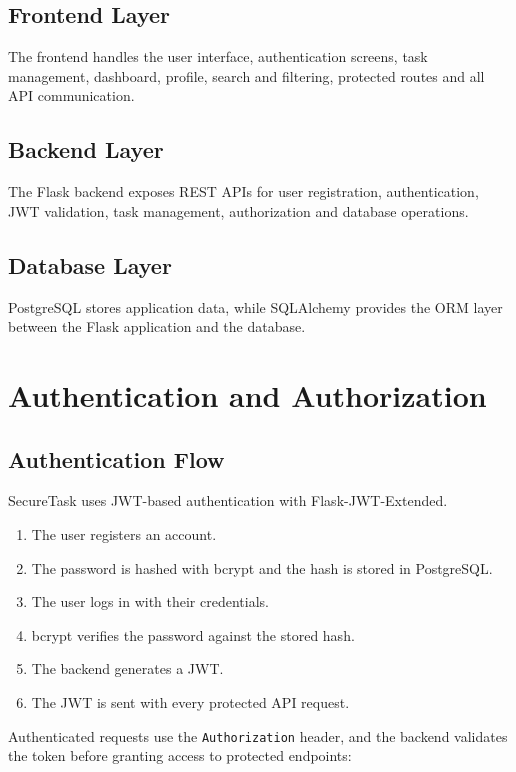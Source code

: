 \documentclass[11pt,a4paper]{article}
\begin{document}
\subsection{Frontend Layer}
The frontend handles the user interface, authentication screens, task management, dashboard, profile, search and filtering, protected routes and all API communication.

\subsection{Backend Layer}
The Flask backend exposes REST APIs for user registration, authentication, JWT validation, task management, authorization and database operations.

\subsection{Database Layer}
PostgreSQL stores application data, while SQLAlchemy provides the ORM layer between the Flask application and the database.

\section{Authentication and Authorization}

\subsection{Authentication Flow}
SecureTask uses JWT-based authentication with Flask-JWT-Extended.

\begin{enumerate}[leftmargin=*]
\item The user registers an account.
\item The password is hashed with bcrypt and the hash is stored in PostgreSQL.
\item The user logs in with their credentials.
\item bcrypt verifies the password against the stored hash.
\item The backend generates a JWT.
\item The JWT is sent with every protected API request.
\end{enumerate}

Authenticated requests use the \texttt{Authorization} header, and the backend validates the token before granting access to protected endpoints:
\end{document}
